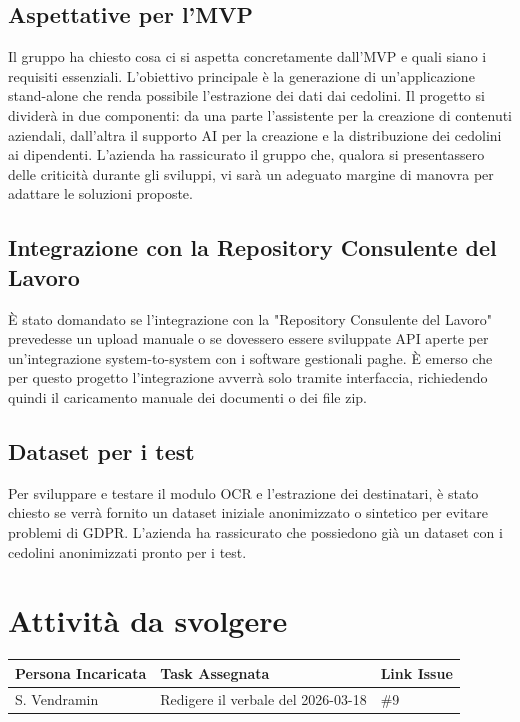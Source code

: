 \documentclass[a4paper, 10pt, colorlinks=true, linkcolor=black, urlcolor=blue, citecolor=blue, hidelinks]{article}
\begin{document}
\subsection{Aspettative per l'MVP}
Il gruppo ha chiesto cosa ci si aspetta concretamente dall'MVP e quali siano i requisiti essenziali. L'obiettivo principale è la generazione di un'applicazione stand-alone che renda possibile l'estrazione dei dati dai cedolini. Il progetto si dividerà in due componenti: da una parte l'assistente per la creazione di contenuti aziendali, dall'altra il supporto AI per la creazione e la distribuzione dei cedolini ai dipendenti. L'azienda ha rassicurato il gruppo che, qualora si presentassero delle criticità durante gli sviluppi, vi sarà un adeguato margine di manovra per adattare le soluzioni proposte.

\subsection{Integrazione con la Repository Consulente del Lavoro}
È stato domandato se l'integrazione con la "Repository Consulente del Lavoro" prevedesse un upload manuale o se dovessero essere sviluppate API aperte per un'integrazione system-to-system con i software gestionali paghe. È emerso che per questo progetto l'integrazione avverrà solo tramite interfaccia, richiedendo quindi il caricamento manuale dei documenti o dei file zip.

\subsection{Dataset per i test}
Per sviluppare e testare il modulo OCR e l'estrazione dei destinatari, è stato chiesto se verrà fornito un dataset iniziale anonimizzato o sintetico per evitare problemi di GDPR. L'azienda ha rassicurato che possiedono già un dataset con i cedolini anonimizzati pronto per i test.

\section{Attività da svolgere}
\begin{center}
\renewcommand{\arraystretch}{1.4}
\begin{tabular}{|p{4.2cm}|p{6.2cm}|p{2.2cm}|}
\hline
\textbf{Persona Incaricata} & \textbf{Task Assegnata} & \centering\textbf{Link Issue} \tabularnewline
\hline
S. Vendramin & Redigere il verbale del 2026-03-18 & \centering \#9 \tabularnewline
\hline

\end{tabular}
\end{center}
\end{document}
